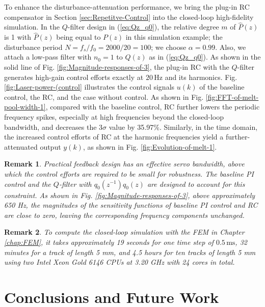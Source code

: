 \documentclass [11pt, proquest] {uwthesis}[2020/02/24]
\newtheorem{remark}{Remark}
\begin{document}
To enhance the disturbance-attenuation performance, we bring the plug-in
RC compensator in Section \ref{sec:Repetitve-Control}
into the closed-loop high-fidelity simulation. In the $Q$-filter
design in (\ref{eq:Qz_q0}), the relative degree $m$ of $\hat{P}(z)$
is 1 with $\hat{P}(z)$ being equal to $P(z)$ in this simulation
example; the disturbance period $N=f_{s}/f_{0}=2000/20=100$; we choose
$\alpha=0.99$. Also, we attach a low-pass filter with $n_{0}=1$
to $Q(z)$ as in (\ref{eq:Qz_q0}). As shown in the solid line of Fig.
\ref{fig:Magnitude-responses-of-3}, the plug-in RC with the $Q$-filter
generates high-gain control efforts exactly at $20\,\text{Hz}$ and
its harmonics. Fig. \ref{fig:Laser-power-(control} illustrates the
control signals $u(k)$ of the baseline control, the RC, and the case
without control. As shown in Fig. \ref{fig:FFT-of-melt-pool-width-1},
compared with the baseline control, RC further lowers the periodic
frequency spikes, especially at high frequencies beyond the closed-loop
bandwidth, and decreases the $3\sigma$ value by 35.97\%. Similarly,
in the time domain, the increased control efforts of RC at the harmonic
frequencies yield a further-attenuated output $y(k)$, as shown in
Fig. \ref{fig:Evolution-of-melt-1}.

\begin{remark} Practical feedback design has an effective servo
bandwidth, above which the control efforts are required to be small
for robustness. The baseline PI control and the $Q$-filter with $q_{0}(z^{-1})q_{0}(z)$
are designed to account for this constraint. As shown in Fig. \ref{fig:Magnitude-responses-of-3},
above approximately 650 Hz, the magnitudes of the sensitivity functions
of baseline PI control and RC are close to zero, leaving the corresponding
frequency components unchanged.
\end{remark}

\begin{remark} To compute the closed-loop simulation with the FEM
in Chapter \ref{chap:FEM}, it takes approximately
19 seconds for one time step of $0.5\,\text{ms}$, 32 minutes for
a track of length 5 mm, and 4.5 hours for ten tracks of length 5 mm
using two Intel Xeon Gold 6146 CPUs at 3.20 GHz with 24 cores in total.
\end{remark}


 
\chapter{Conclusions and Future Work} \label{chap:Conclusions}
\end{document}

